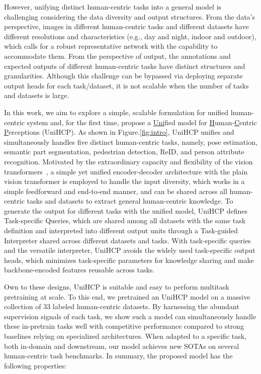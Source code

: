 \documentclass[10pt,twocolumn,letterpaper]{article}
\begin{document}
However, unifying distinct human-centric tasks into a general model is challenging considering the data diversity and output structures. From the data's perspective, images in different human-centric tasks and  different datasets have different resolutions and characteristics (e.g., day and night, indoor and outdoor), which calls for a robust representative network with the capability to accommodate them. From the perspective of output, the annotations and expected outputs of different human-centric tasks have distinct structures and granularities. Although this challenge can be bypassed via deploying separate output heads for each task/dataset, it is not scalable when the number of tasks and datasets is large.







In this work, we aim to explore a simple, scalable formulation for unified human-centric system and, for the first time, propose a \underline{Uni}fied model for \underline{H}uman-\underline{C}entric \underline{P}erceptions (UniHCP). As shown in Figure.\ref{fig:intro}, UniHCP unifies and simultaneously handles five distinct human-centric tasks, namely, pose estimation, semantic part segmentation, pedestrian detection, ReID, and person attribute recognition. 
Motivated by the extraordinary capacity and flexibility of the vision transformers~\cite{li2022exploring,zhai2022scaling}, a simple yet unified encoder-decoder architecture with the plain vision transformer is employed to handle the input diversity, which works in a simple feedforward and end-to-end manner, and can be shared across all human-centric tasks and datasets to extract general human-centric knowledge. 
To generate the output for different tasks with the unified model, UniHCP defines Task-specific Queries, which are shared among all datasets with the same task definition and interpreted into different output units through a Task-guided Interpreter shared across different datasets and tasks.
With task-specific queries and the versatile interpreter, UniHCP avoids the widely used task-specific output heads, which minimizes task-specific parameters for knowledge sharing and make backbone-encoded features reusable across tasks.


Own to these designs, UniHCP is suitable and easy to perform multitask pretraining at scale. To this end, we pretrained an UniHCP model on a massive collection of 33 labeled human-centric datasets. By harnessing the abundant supervision signals of each task, we show such a model can simultaneously handle these in-pretrain tasks well with competitive performance compared to strong baselines relying on specialized architectures. When adapted to a specific task, both in-domain and downstream, our model achieves new SOTAs on several human-centric task benchmarks. In summary, the proposed model has the following properties:
\end{document}
